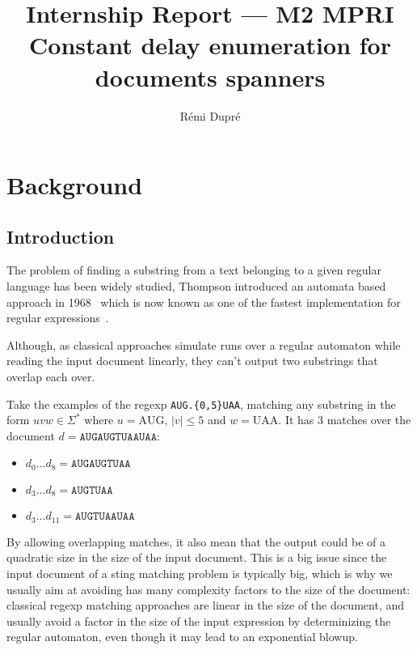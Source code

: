 \documentclass[12px]{article}
\title{%
  Internship Report --- M2 MPRI \\
  Constant delay enumeration for documents spanners
}
\author{Rémi Dupré}
\begin{document}
  \maketitle

  
  \pagebreak

  \section{Background}

    \subsection{Introduction}

      The problem of finding a substring from a text belonging to a given
      regular language has been widely studied, Thompson introduced an automata
      based approach in 1968~\cite{thompson1968programming} which is now known
      as one of the fastest implementation for regular
      expressions~\cite{cox2007regular}.

      Although, as classical approaches simulate runs over a regular automaton
      while reading the input document linearly, they can't output two
      substrings that overlap each over.

      Take the examples of the regexp \texttt{AUG.\{0,5\}UAA}, matching any
      substring in the form $uvw \in \Sigma^*$ where $u = \text{AUG}$, $|v|
      \leq 5$ and $w = \text{UAA}$. It has 3 matches over the document $d =
      \texttt{AUGAUGTUAAUAA}$:
      \begin{itemize}
        \item $d_0 \ldots d_8 = \texttt{AUGAUGTUAA}$
        \item $d_3 \ldots d_8 = \texttt{AUGTUAA}$
        \item $d_3 \ldots d_{11} = \texttt{AUGTUAAUAA}$
      \end{itemize}

      By allowing overlapping matches, it also mean that the output could be of
      a quadratic size in the size of the input document. This is a big issue
      since the input document of a sting matching problem is typically big,
      which is why we usually aim at avoiding has many complexity factors to
      the size of the document: classical regexp matching approaches are linear
      in the size of the document, and usually avoid a factor in the size of
      the input expression by determinizing the regular automaton, even though
      it may lead to an exponential blowup.
\end{document}
